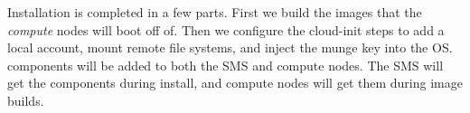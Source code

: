 Installation is completed in a few parts. First we build the images that the
{\em compute} nodes will boot off of. Then we configure the cloud-init steps
to add a local account, mount remote file systems, and inject the munge key
into the OS. \OHPC{} components will be added to both the SMS and compute nodes.
The SMS will get the components during install, and compute nodes will get them
during image builds.
